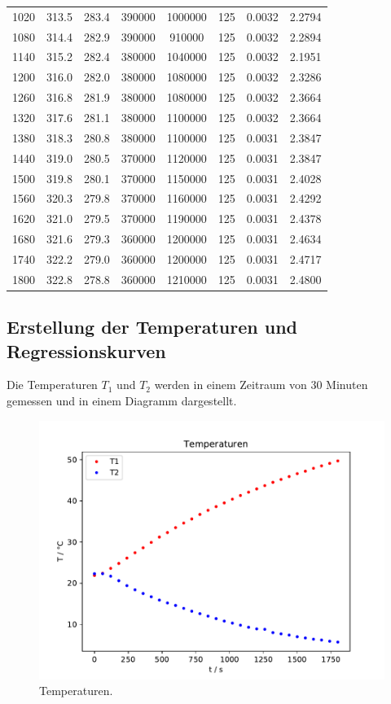 \begin{table}[H]
\begin{tabular}{c c c c c c c c}
    1020  &  313.5 &  283.4 & 390000  & 1000000 & 125 & 0.0032 & 2.2794 \\
    1080  &  314.4 &  282.9 & 390000  &  910000 & 125 & 0.0032 & 2.2894 \\
    1140  &  315.2 &  282.4 & 380000  & 1040000 & 125 & 0.0032 & 2.1951 \\
    1200  &  316.0 &  282.0 & 380000  & 1080000 & 125 & 0.0032 & 2.3286 \\
    1260  &  316.8 &  281.9 & 380000  & 1080000 & 125 & 0.0032 & 2.3664 \\
    1320  &  317.6 &  281.1 & 380000  & 1100000 & 125 & 0.0032 & 2.3664 \\
    1380  &  318.3 &  280.8 & 380000  & 1100000 & 125 & 0.0031 & 2.3847 \\
    1440  &  319.0 &  280.5 & 370000  & 1120000 & 125 & 0.0031 & 2.3847 \\
    1500  &  319.8 &  280.1 & 370000  & 1150000 & 125 & 0.0031 & 2.4028 \\
    1560  &  320.3 &  279.8 & 370000  & 1160000 & 125 & 0.0031 & 2.4292 \\
    1620  &  321.0 &  279.5 & 370000  & 1190000 & 125 & 0.0031 & 2.4378 \\
    1680  &  321.6 &  279.3 & 360000  & 1200000 & 125 & 0.0031 & 2.4634 \\
    1740  &  322.2 &  279.0 & 360000  & 1200000 & 125 & 0.0031 & 2.4717 \\
    1800  &  322.8 &  278.8 & 360000  & 1210000 & 125 & 0.0031 & 2.4800 \\
    \bottomrule
  \end{tabular}
\end{table}
\subsection{Erstellung der Temperaturen und Regressionskurven}
Die Temperaturen $T_1$ und $T_2$ werden in einem Zeitraum von 30 Minuten gemessen und in einem Diagramm dargestellt.

\begin{figure}[H]
  \centering
  \includegraphics{build/Temperaturen.pdf}
  \caption{Temperaturen.}
  \label{fig:Temperaturen}
\end{figure}


